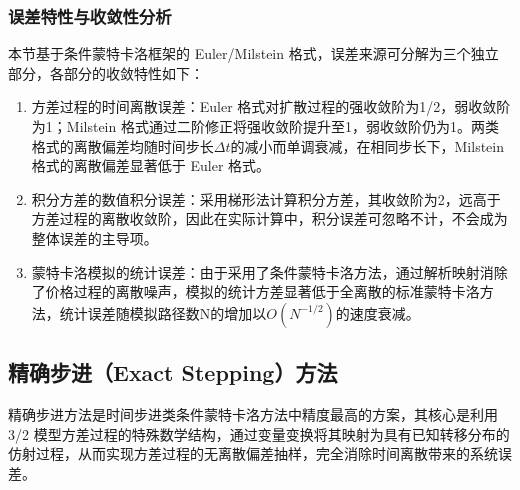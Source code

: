 \subsubsection{误差特性与收敛性分析}
本节基于条件蒙特卡洛框架的 Euler/Milstein 格式，误差来源可分解为三个独立部分，各部分的收敛特性如下：
\begin{enumerate}
  \item 方差过程的时间离散误差：Euler 格式对扩散过程的强收敛阶为1/2，弱收敛阶为1；Milstein 格式通过二阶修正将强收敛阶提升至1，弱收敛阶仍为1。两类格式的离散偏差均随时间步长$\Delta t$的减小而单调衰减，在相同步长下，Milstein 格式的离散偏差显著低于 Euler 格式。
  \item 积分方差的数值积分误差：采用梯形法计算积分方差，其收敛阶为2，远高于方差过程的离散收敛阶，因此在实际计算中，积分误差可忽略不计，不会成为整体误差的主导项。
  \item 蒙特卡洛模拟的统计误差：由于采用了条件蒙特卡洛方法，通过解析映射消除了价格过程的离散噪声，模拟的统计方差显著低于全离散的标准蒙特卡洛方法，统计误差随模拟路径数N的增加以$O(N^{−1/2})$的速度衰减。
\end{enumerate}

\subsection{精确步进（Exact Stepping）方法}
精确步进方法是时间步进类条件蒙特卡洛方法中精度最高的方案，其核心是利用 3/2 模型方差过程的特殊数学结构，通过变量变换将其映射为具有已知转移分布的仿射过程，从而实现方差过程的无离散偏差抽样，完全消除时间离散带来的系统误差。
